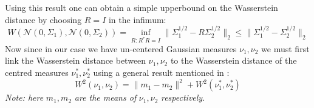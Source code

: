 \documentclass{article}
\theoremstyle{definition}
\theoremstyle{remark}
\begin{document}
Using this result one can obtain a simple upperbound on the Wasserstein distance by choosing $R=I$ in the infimum:
\begin{equation*}
    W(\mathcal{N}(0,\Sigma_1),\mathcal{N}(0,\Sigma_2))=\inf_{R:R^{*}R=I}\|\Sigma_{1}^{1/2}-R\Sigma_{2}^{1/2}\|_{2} \leq \|\Sigma_{1}^{1/2}-\Sigma_{2}^{1/2}\|_{2}
\end{equation*}
Now since in our case we have un-centered Gaussian measures $\nu_{1},\nu_{2}$ we must first link the Wasserstein distance between $\nu_1,\nu_2$ to the Wasserstein distance of the centred measures $\nu_{1}^{*},\nu_{2}^{*}$ using a general result mentioned in \cite{cuesta1996lower}:
\begin{equation*}
    W^2(\nu_{1},\nu_{2})=\|m_1-m_2\|^{2}+W^{2}(\nu_{1}^*,\nu_{2}^{*})
\end{equation*}
\textit{Note: here} $m_1,m_2$ \textit{are the means of} $\nu_{1},\nu_{2}$ \textit{respectively}. \\
\end{document}
